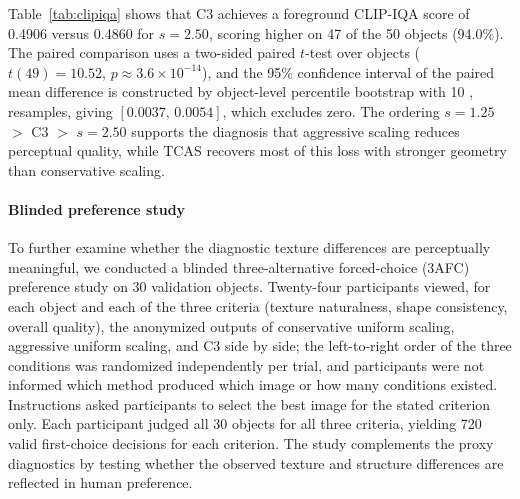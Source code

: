 \documentclass[times,twocolumn,final]{elsarticle}
\providecommand{\DIFadd}[1]{{\protect\color{red} \sf #1}} %
\providecommand{\DIFaddFL}[1]{\DIFadd{#1}} %
\begin{document}
\begin{table}[t]
\centering
\caption{\DIFaddFL{CLIP-IQA perceptual validation on 50 validation objects. Scores are reported for foreground regions and full rendered views; $\pm$ denotes the standard deviation across the 50 objects. Higher is better.}}
\label{tab:clipiqa}
\end{table}

\DIFadd{Table~\ref{tab:clipiqa} shows that C3 achieves a foreground CLIP-IQA score of 0.4906 versus 0.4860 for $s = 2.50$, scoring higher on 47 of the 50 objects (94.0\%). The paired comparison uses a two-sided paired $t$-test over objects ($t(49)=10.52$, $p\approx3.6\times10^{-14}$), and the 95\% confidence interval of the paired mean difference is constructed by object-level percentile bootstrap with 10}{\DIFadd{,}}\DIFadd{000 resamples, giving $[0.0037,\,0.0054]$, which excludes zero. The ordering $s = 1.25$ $>$ C3 $>$ $s = 2.50$ supports the diagnosis that aggressive scaling reduces perceptual quality, while TCAS recovers most of this loss with stronger geometry than conservative scaling.
}

\paragraph{\DIFadd{Blinded preference study}}
\DIFadd{To further examine whether the diagnostic texture differences are perceptually meaningful, we conducted a blinded three-alternative forced-choice (3AFC) preference study on 30 validation objects. Twenty-four participants viewed, for each object and each of the three criteria (texture naturalness, shape consistency, overall quality), the anonymized outputs of conservative uniform scaling, aggressive uniform scaling, and C3 side by side; the left-to-right order of the three conditions was randomized independently per trial, and participants were not informed which method produced which image or how many conditions existed. Instructions asked participants to select the best image for the stated criterion only. Each participant judged all 30 objects for all three criteria, yielding 720 valid first-choice decisions for each criterion. The study complements the proxy diagnostics by testing whether the observed texture and structure differences are reflected in human preference.
}
\end{document}
